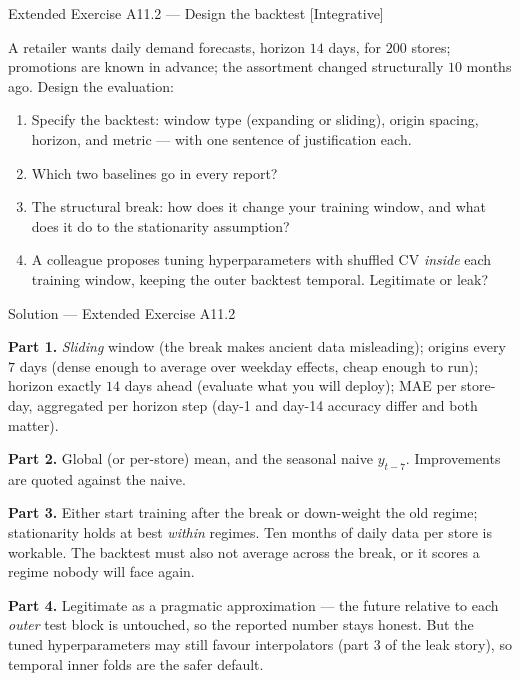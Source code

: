 \documentclass[aspectratio=169,11pt]{beamer}
\begin{document}
\begin{frame}{Extended Exercise A11.2 --- Design the backtest [Integrative]}
  \begin{longexercise}
    A retailer wants daily demand forecasts, horizon $14$ days, for $200$ stores;
    promotions are known in advance; the assortment changed structurally $10$
    months ago. Design the evaluation:
    \begin{enumerate}
      \item Specify the backtest: window type (expanding or sliding), origin
            spacing, horizon, and metric --- with one sentence of justification
            each.
      \item Which two baselines go in every report?
      \item The structural break: how does it change your training window, and
            what does it do to the stationarity assumption?
      \item A colleague proposes tuning hyperparameters with shuffled CV
            \emph{inside} each training window, keeping the outer backtest
            temporal. Legitimate or leak?
    \end{enumerate}
  \end{longexercise}
\end{frame}

\begin{frame}{Solution --- Extended Exercise A11.2}
  \begin{solutionbox}
    \footnotesize
    \textbf{Part 1.} \emph{Sliding} window (the break makes ancient data
    misleading); origins every $7$ days (dense enough to average over weekday
    effects, cheap enough to run); horizon exactly $14$ days ahead (evaluate what
    you will deploy); MAE per store-day, aggregated per horizon step (day-1 and
    day-14 accuracy differ and both matter).
    \par\smallskip
    \textbf{Part 2.} Global (or per-store) mean, and the seasonal naive
    $y_{t-7}$. Improvements are quoted against the naive.
    \par\smallskip
    \textbf{Part 3.} Either start training after the break or down-weight the old
    regime; stationarity holds at best \emph{within} regimes. Ten months of daily
    data per store is workable. The backtest must also not average across the
    break, or it scores a regime nobody will face again.
    \par\smallskip
    \textbf{Part 4.} Legitimate as a pragmatic approximation --- the future
    relative to each \emph{outer} test block is untouched, so the reported number
    stays honest. But the tuned hyperparameters may still favour interpolators
    (part 3 of the leak story), so temporal inner folds are the safer default.
  \end{solutionbox}
\end{frame}
\end{document}
